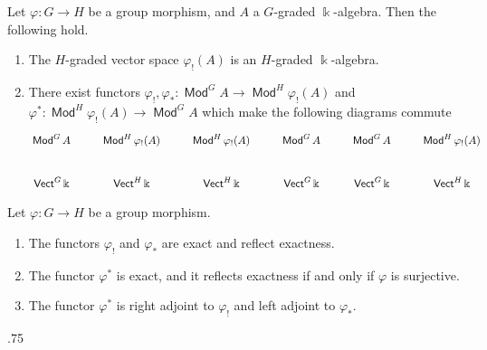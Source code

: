 \documentclass[11pt,fleqn]{article}
\makeatletter
\renewenvironment{proof}[1][\textit{Proof}]{\par
  \pushQED{\qed}%
  \normalfont \topsep.75\paraskip\relax
  \trivlist
  \item[\hskip\labelsep
        \itshape
    #1\@addpunct{.}]\ignorespaces
}{%
  \popQED\endtrivlist\@endpefalse
}
\renewcommand\to{\longrightarrow}
\renewcommand\phi{\varphi}
\renewcommand\k{\Bbbk}
\DeclareMathOperator\Mod{\mathsf{Mod}}
\DeclareMathOperator\Vect{\mathsf{Vect}}
\makeatother
\begin{document}
\begin{Lemma*}
Let $\phi: G \to H$ be a group morphism, and $A$ a $G$-graded $\k$-algebra.
Then the following hold.
\begin{enumerate}
\item The $H$-graded vector space $\phi_!(A)$ is an $H$-graded $\k$-algebra.
\item There exist functors $\phi_!, \phi_* : \Mod^G A \to \Mod^H \phi_!(A)$
and $\phi^*: \Mod^H \phi_!(A) \to \Mod^G A$ which make the following diagrams
commute
\begin{align*}
\xymatrix{
  \Mod^G A 
    & \Mod^H \phi_!(A) 
    & \Mod^H \phi_!(A)  
    & \Mod^G A
    & \Mod^G A 
    & \Mod^H \phi_!(A) \\
  \Vect^G \k 
    & \Vect^H \k
    & \Vect^H \k  
    & \Vect^G \k
    & \Vect^G \k
    & \Vect^H \k
}
\end{align*}
\end{enumerate}
\end{Lemma*}


\begin{Proposition}
Let $\phi: G \to H$ be a group morphism. 
\begin{enumerate}
\item The functors $\phi_!$ and $\phi_*$ are exact and reflect exactness.
\item The functor $\phi^*$ is exact, and it reflects exactness if and only if
  $\phi$ is surjective.
\item The functor $\phi^*$ is right adjoint to $\phi_!$ and left adjoint to 
  $\phi_*$.
\end{enumerate}
\end{Proposition}
\begin{proof}

\end{proof}
\end{document}
